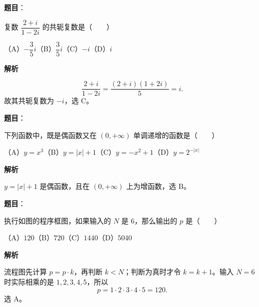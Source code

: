 

\begin{answer}

\textbf{题目}：

复数 $\dfrac{2+i}{1-2i}$ 的共轭复数是\mbox{（　　）}

（A）$-\dfrac35i$\quad（B）$\dfrac35i$\quad（C）$-i$\quad（D）$i$

\textbf{解析}

\nopagebreak[4]
\[
\frac{2+i}{1-2i}=\frac{(2+i)(1+2i)}5=i.
\]
故其共轭复数为 $-i$，选 C。


\end{answer}
\begin{answer}

\textbf{题目}：

下列函数中，既是偶函数又在 $(0,+\infty)$ 单调递增的函数是\mbox{（　　）}

（A）$y=x^3$\quad（B）$y=|x|+1$\quad（C）$y=-x^2+1$\quad（D）$y=2^{-|x|}$

\textbf{解析}

$y=|x|+1$ 是偶函数，且在 $(0,+\infty)$ 上为增函数，选 B。


\end{answer}
\begin{answer}

\textbf{题目}：

执行如图的程序框图，如果输入的 $N$ 是 $6$，那么输出的 $p$ 是\mbox{（　　）}
\nopagebreak[4]
\begin{center}\end{center}
\nopagebreak[4]
（A）$120$\quad（B）$720$\quad（C）$1440$\quad（D）$5040$

\textbf{解析}

流程图先计算 $p=p\cdot k$，再判断 $k<N$；判断为真时才令 $k=k+1$。输入 $N=6$ 时实际相乘的是 $1,2,3,4,5$，所以
\nopagebreak[4]
\[
p=1\cdot2\cdot3\cdot4\cdot5=120.
\]
选 A。


\end{answer}
